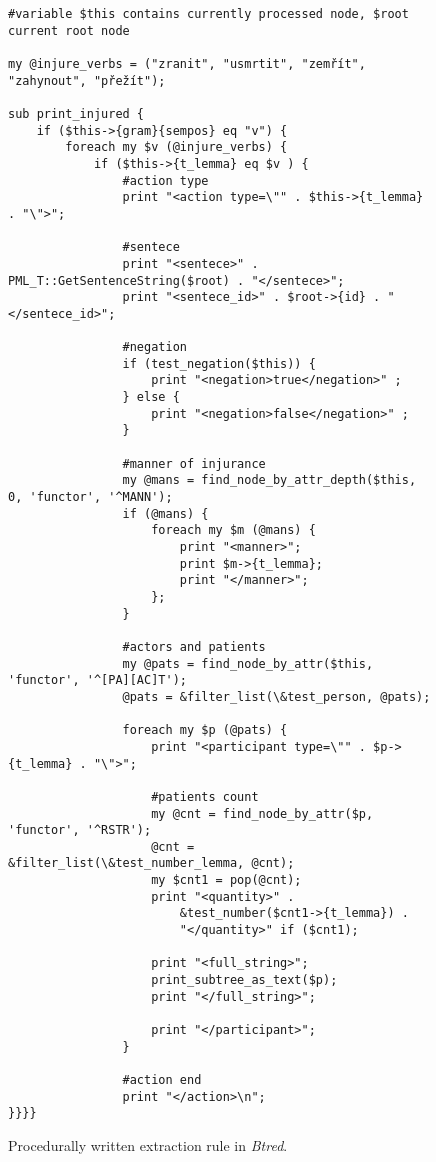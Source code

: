 \begin{figure}
\begin{verbatim}
#variable $this contains currently processed node, $root current root node

my @injure_verbs = ("zranit", "usmrtit", "zemřít", "zahynout", "přežít");

sub print_injured {
	if ($this->{gram}{sempos} eq "v") {
		foreach my $v (@injure_verbs) {
			if ($this->{t_lemma} eq $v ) {
				#action type
				print "<action type=\"" . $this->{t_lemma} . "\">";

				#sentece
				print "<sentece>" . PML_T::GetSentenceString($root) . "</sentece>";
				print "<sentece_id>" . $root->{id} . "</sentece_id>";
				
				#negation
				if (test_negation($this)) {
					print "<negation>true</negation>" ;					
				} else {
					print "<negation>false</negation>" ;										
				}
								
				#manner of injurance
				my @mans = find_node_by_attr_depth($this, 0, 'functor', '^MANN');
				if (@mans) {
					foreach my $m (@mans) {
						print "<manner>"; 
						print $m->{t_lemma};
						print "</manner>"; 
					};
				}
				
				#actors and patients
				my @pats = find_node_by_attr($this, 'functor', '^[PA][AC]T');
				@pats = &filter_list(\&test_person, @pats);
				
				foreach my $p (@pats) {
					print "<participant type=\"" . $p->{t_lemma} . "\">";

					#patients count
					my @cnt = find_node_by_attr($p, 'functor', '^RSTR');
					@cnt = &filter_list(\&test_number_lemma, @cnt);
					my $cnt1 = pop(@cnt);
					print "<quantity>" . 
						&test_number($cnt1->{t_lemma}) . 
						"</quantity>" if ($cnt1);
	
					print "<full_string>";
					print_subtree_as_text($p);
					print "</full_string>";

					print "</participant>";
				}
				
				#action end
				print "</action>\n";											
}}}}
\end{verbatim} 
																																		\begin{comment}
																																		this >>$<< hacks my syntax highlighter :-)
																																		\end{comment}
\caption{Procedurally written extraction rule in \emph{Btred}.}
\label{lst:btred_rule}
\end{figure}





